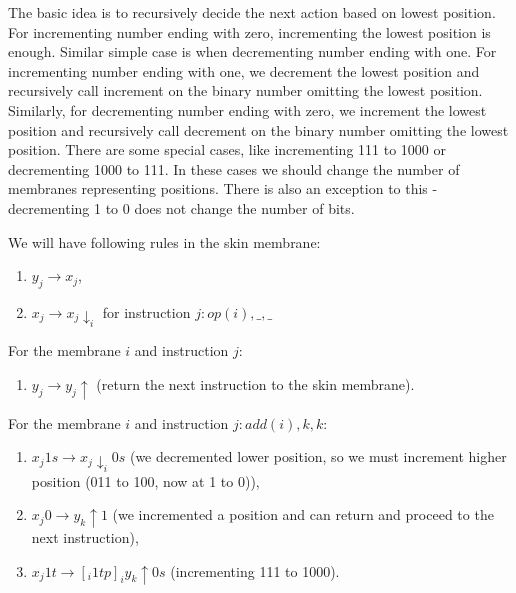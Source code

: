     The basic idea is to recursively decide the next action based on lowest position. For incrementing number ending with zero, incrementing the lowest position is enough. Similar simple case is when decrementing number ending with one. For incrementing number ending with one, we decrement the lowest position and recursively call increment on the binary number omitting the lowest position. Similarly, for decrementing number ending with zero, we increment the lowest position and recursively call decrement on the binary number omitting the lowest position.
    There are some special cases, like incrementing 111 to 1000 or decrementing 1000 to 111. In these cases we should change the number of membranes representing positions. There is also an exception to this - decrementing 1 to 0 does not change the number of bits.

    We will have following rules in the skin membrane:
    \begin{enumerate}
      \item\label{optim_skin_next_instruction} $y_j \rightarrow x_j$,
      \item\label{optim_skin_send_down} $x_j \rightarrow x_j\downarrow_{i}$ for instruction $j: op(i), \_, \_$
    \end{enumerate}

    For the membrane $i$ and instruction $j$:
    \begin{enumerate}[resume]
      \item\label{optim_inner_resend_up} $y_j \rightarrow y_j \uparrow$ (return the next instruction to the skin membrane).
    \end{enumerate}

    For the membrane $i$ and instruction $j: add(i),k,k$:
    \begin{enumerate}[resume]
      \item\label{optim_inner_add_1} $x_j1s \rightarrow x_j\downarrow_{i}0s$ (we decremented lower position, so we must increment higher position (011 to 100, now at 1 to 0)),
      \item\label{optim_inner_add_0} $x_j0 \rightarrow y_k \uparrow 1$ (we incremented a position and can return and proceed to the next instruction),
      \item\label{optim_inner_add_1_highest} $x_j1t \rightarrow [_i 1tp]_iy_k\uparrow 0s$ (incrementing 111 to 1000).
    \end{enumerate}

